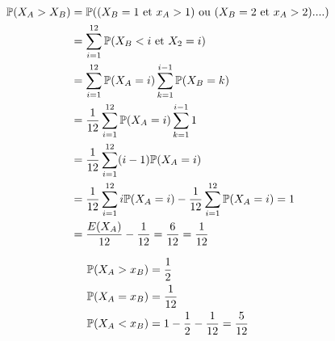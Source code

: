\begin{align*}
    \mathbb{P}(X_A > X_B) &= \mathbb{P}((X_B=1 \text{ et }x_A>1)\text{ ou } (X_B=2 \text{ et }x_A>2)....)\\
    &= \sum_{i=1}^{12}\mathbb{P}(X_B < i \text{ et }X_2=i)\\
     &= \sum_{i=1}^{12}\mathbb{P}(X_A = i) \sum_{k=1}^{i-1}\mathbb{P}(X_B = k)\\
     &= \frac{1}{12}\sum_{i=1}^{12}\mathbb{P}(X_A = i)\sum_{k=1}^{i-1}1\\
     &= \frac{1}{12}\sum_{i=1}^{12}(i-1)\mathbb{P}(X_A = i)\\
      &= \frac{1}{12}\sum_{i=1}^{12}i\mathbb{P}(X_A = i) - \frac{1}{12}\sum_{i=1}^{12}\mathbb{P}(X_A = i) = 1\\
       &= \frac{E(X_A)}{12} - \frac{1}{12} = \frac{6}{12} = \frac{1}{12}
\end{align*}


\begin{align*}
    \mathbb{P}(X_A > x_B) &= \frac{1}{2}\\
    \mathbb{P}(X_A = x_B) &= \frac{1}{12}\\
    \mathbb{P}(X_A < x_B) &= 1 - \frac{1}{2} - \frac{1}{12} = \frac{5}{12}
\end{align*}